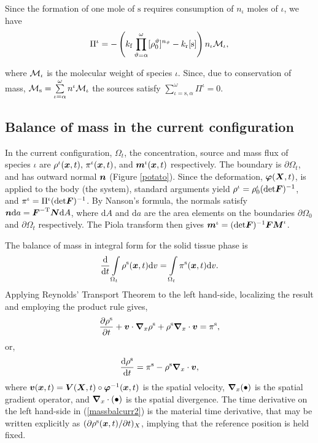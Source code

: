 \noindent Since the formation of one mole of $\mathrm{s}$ requires
consumption of $n_\iota$ moles of $\iota$, we have
\begin{equation}
\Pi^\iota =
-\left(k_\mathrm{f}\prod\limits_{\vartheta=\alpha}^\omega
[\rho_0^\vartheta]^{n_\vartheta} -
k_\mathrm{r}[\mathrm{s}]\right)n_\iota{\mathcal M}_\iota, \label{sourceI}
\end{equation}

\noindent where ${\mathcal M}_\iota$ is the molecular weight of species
$\iota$. Since, due to conservation of mass, ${\mathcal M}_\mathrm{s} =
\sum\limits_{\iota=\alpha}^\omega n^\iota{\mathcal M}_\iota$ the sources
satisfy $\sum\limits_{\iota=\mathrm{s},\alpha}^\omega \Pi^\iota =
0$.

\subsection{Balance of mass in the current configuration}
\label{sect2.2} In the current configuration, $\Omega_t$, the
concentration, source and mass flux of species $\iota$ are
$\rho^\iota(\mbox{\boldmath$ x$},t),\,\pi^\iota\mathrm(\mbox{\boldmath$ x$},t)$, and
$\mbox{\boldmath$ m$}^\iota(\mbox{\boldmath$ x$},t)$ respectively. The boundary is
$\partial\Omega_t$, and has outward normal $\mbox{\boldmath$ n$}$ (Figure
\ref{potato}). Since the deformation, $\mbox{\boldmath$\varphi$}(\mbox{\boldmath$ X$},t)$, is
applied to the body (the system), standard arguments yield
$\rho^\iota = \rho_0^\iota(\mathrm{det}\mbox{\boldmath$ F$})^{-1}$, and $\pi^\iota
= \Pi^\iota(\mathrm{det}\mbox{\boldmath$ F$})^{-1}$. By Nanson's formula, the
normals satisfy $\mbox{\boldmath$ n$}\mathrm{d}a =
\mbox{\boldmath$ F$}^{-\mathrm{T}}\mbox{\boldmath$ N$}\mathrm{d}A$, where $\mathrm{d}A$ and
$\mathrm{d}a$ are the area elements on the boundaries
$\partial\Omega_0$ and $\partial\Omega_t$ respectively. The Piola
transform then gives $\mbox{\boldmath$ m$}^\iota =
(\mathrm{det}\mbox{\boldmath$ F$})^{-1}\mbox{\boldmath$ F$}\mbox{\boldmath$ M$}^\iota$.

The balance of mass in integral form for the solid tissue phase is
\begin{equation}
\frac{\mathrm{d}}{\mathrm{d}t}
\int\limits_{\Omega_t}\rho^\mathrm{s}(\mbox{\boldmath$ x$},t)\mathrm{d}v =
\int\limits_{\Omega_t}\pi^\mathrm{s}(\mbox{\boldmath$ x$},t)\mathrm{d}v.
\label{massbalcurr1}
\end{equation}
\noindent Applying Reynolds' Transport Theorem to the left
hand-side, localizing the result and employing the product rule
gives,
\begin{equation}
\frac{\partial\rho^\mathrm{s}}{\partial t} +
\mbox{\boldmath$ v$}\cdot\mbox{\boldmath$\nabla$}_x\rho^\mathrm{s} + \rho^\mathrm{s}
\mbox{\boldmath$\nabla$}_x\cdot\mbox{\boldmath$ v$} = \pi^\mathrm{s},\nonumber
\end{equation}
\noindent or,
\begin{equation}
\frac{\mathrm{d}\rho^\mathrm{s}}{\mathrm{d}t} = \pi^\mathrm{s} -
\rho^\mathrm{s} \mbox{\boldmath$\nabla$}_x\cdot\mbox{\boldmath$ v$}, \label{massbalcurr2}
\end{equation}
\noindent where $\mbox{\boldmath$ v$}(\mbox{\boldmath$ x$},t) = \mbox{\boldmath$ V$}(\mbox{\boldmath$ X$},t)\circ\mbox{\boldmath$\varphi$}^{-1}(\mbox{\boldmath$ x$},t)$
is the spatial velocity, $\mbox{\boldmath$\nabla$}_x(\bullet)$ is the spatial
gradient operator, and $\mbox{\boldmath$\nabla$}_x\cdot(\bullet)$ is the spatial
divergence. The time derivative on the left hand-side in
(\ref{massbalcurr2}) is the material time derivative, that may be
written explicitly as $(\partial\rho^\mathrm{s}(\mbox{\boldmath$ x$},t)/\partial
t)_X$, implying that the reference position is held fixed.

